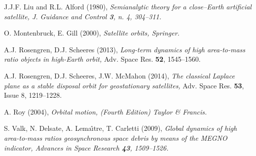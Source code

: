 \documentclass[12pt,reqno]{amsart}
\numberwithin{equation}{section}
\begin{document}
\begin{thebibliography}{}
J.J.F. Liu and R.L. Alford (1980), \sl Semianalytic theory for a close--Earth artificial satellite, \rm
J. Guidance and Control {\bf 3}, n. 4, 304--311.

O. Montenbruck, E. Gill (2000), \em Satellite orbits, \rm Springer.

A.J. Rosengren, D.J. Scheeres (2013), {\sl Long-term dynamics of high
area-to-mass ratio objects in high-Earth orbit,} Adv. Space Res.
\textbf{52}, 1545--1560.

A.J. Rosengren, D.J. Scheeres, J.W. McMahon (2014), {\sl The classical
Laplace plane as a stable disposal orbit for geostationary
satellites,} Adv. Space Res. {\bf 53}, Issue 8, 1219--1228.

A. Roy (2004), \em Orbital motion, \rm (Fourth Edition) Taylor \& Francis.

S. Valk, N. Delsate, A. Lema\^{\i}tre, T. Carletti (2009), \sl Global dynamics of high area-to-mass ratios
geosynchronous space debris by means of the MEGNO indicator, \rm Advances in Space Research {\bf 43}, 1509--1526.


\end{thebibliography}
\end{document}
